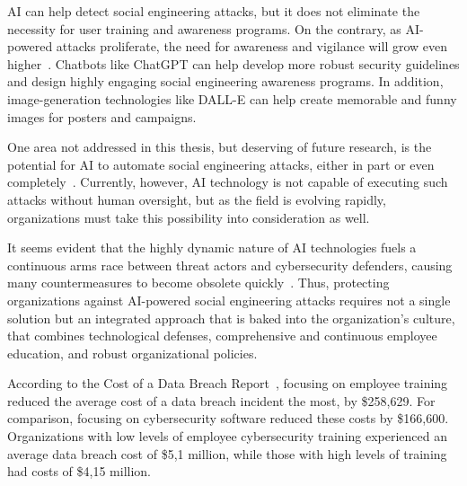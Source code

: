 AI can help detect social engineering attacks, but it does not eliminate the necessity for user training and awareness programs. On the contrary, as AI-powered attacks proliferate, the need for awareness and vigilance will grow even higher~\citep{fakhouri_AI_Driven_Solutions_SE_Attacks_2024}. Chatbots like ChatGPT can help develop more robust security guidelines and design highly engaging social engineering awareness programs. In addition, image-generation technologies like DALL-E can help create memorable and funny images for posters and campaigns.

One area not addressed in this thesis, but deserving of future research, is the potential for AI to automate social engineering attacks, either in part or even completely~\citep{mirsky_Threat_Offensive_AI_Organizations_2023}. Currently, however, AI technology is not capable of executing such attacks without human oversight, but as the field is evolving rapidly, organizations must take this possibility into consideration as well.





It seems evident that the highly dynamic nature of AI technologies fuels a continuous arms race between threat actors and cybersecurity defenders, causing many countermeasures to become obsolete quickly~\citep{fakhouri_AI_Driven_Solutions_SE_Attacks_2024}. Thus, protecting organizations against AI-powered social engineering attacks requires not a single solution but an integrated approach that is baked into the organization's culture, that combines technological defenses, comprehensive and continuous employee education, and robust organizational policies.


According to the Cost of a Data Breach Report~\citep{ibm_Cost_Data_Breach_Report_2024}, focusing on employee training reduced the average cost of a data breach incident the most, by \$258,629. For comparison, focusing on cybersecurity software reduced these costs by \$166,600. Organizations with low levels of employee cybersecurity training experienced an average data breach cost of \$5,1 million, while those with high levels of training had costs of \$4,15 million.

